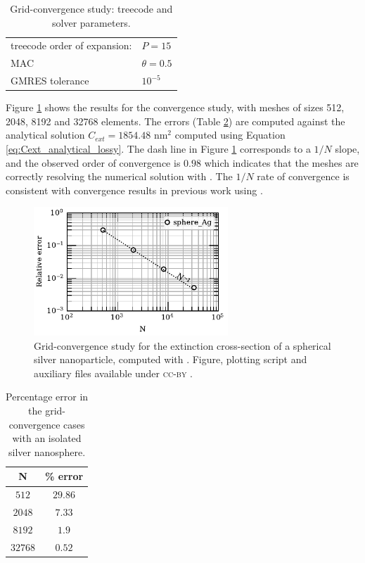 \begin{table}%
    \centering
    \caption{\label{table:treeparams1} Grid-convergence study: treecode and solver parameters.} 
    \begin{tabular}{l l}
    \hline%
    treecode order of expansion: & $P=15$\\
    MAC                          & $\theta=0.5$\\
    GMRES tolerance                    & $10^{-5}$\\
    \hline%
    \end{tabular}
\end{table}

Figure \ref{fig:conv_iso_sph} shows the results for the convergence study, with meshes of sizes 512, 2048, 
8192 and 32768 elements. The errors (Table \ref{table:err_iso_sph}) are computed against 
the analytical solution $C_{ext} = 1854.48$ nm$^2$ computed using Equation \eqref{eq:Cext_analytical_lossy}.
The dash line in Figure \ref{fig:conv_iso_sph} corresponds to a $1/N$ slope, and the observed order of 
convergence is $0.98$ which indicates that the meshes are correctly resolving the numerical solution with \pygbe.
The $1/N$ rate of convergence is consistent with convergence results in
previous work using \pygbe \cite{CooperBardhanBarba2013}. 

\begin{figure}[h] %
    \centering
    \includegraphics[width=0.65\textwidth]{convergence_sph_Ag_R8_w380.pdf} 
    \caption{Grid-convergence study for the extinction cross-section of a spherical silver
             nanoparticle, computed with \pygbe. Figure, plotting script and auxiliary files 
             available under \textsc{cc-by} \cite{ClementiETal2018c}.}
    \label{fig:conv_iso_sph}
 \end{figure}
 
 
 \begin{table}[h]
     \centering
     \caption{\label{table:err_iso_sph} Percentage error in the grid-convergence cases with an 
     isolated silver nanosphere.} 
     \begin{tabular}{c c}
     \hline%
     N & \% error \\
     \hline%
      $512$ & $29.86$ \\
      $2048$ & $7.33$ \\
      $8192$ & $1.9$ \\
      $32768$ & $0.52$ \\
     \hline%
     \end{tabular}
 \end{table}


